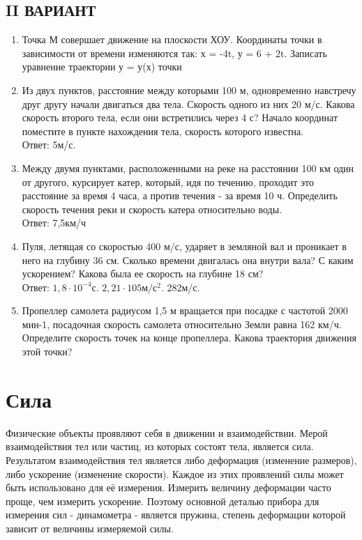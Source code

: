 \documentclass[a6paper, 11pt]{diss_4}
\renewcommand{\'}{\,'}
\begin{document}
\subsection{II ВАРИАНТ}
\begin{enumerate}
\item Точка М совершает движение на плоскости ХОУ. Координаты точки в зависимости от времени изменяются так: х = -4t, у = 6 + 2t. Записать уравнение траектории у = у(х) точки
\item Из двух пунктов, расстояние между которыми 100 м, одновременно навстречу друг другу начали двигаться два тела. Скорость одного из них 20 м/с. Какова скорость второго тела, если они встретились через 4 с? Начало координат поместите в пункте нахождения тела, скорость которого известна.
\\ Ответ: 5м/с.

\item Между двумя пунктами, расположенными на реке на расстоянии 100 км один от другого, курсирует катер, который, идя по течению, проходит это расстояние за время 4 часа, а против течения - за время 10 ч. Определить скорость течения реки и скорость катера относительно воды.
\\ Ответ: 7,5км/ч
\item Пуля, летящая со скоростью 400 м/с, ударяет в земляной вал и проникает в него на глубину 36 см. Сколько времени двигалась она внутри вала? С каким ускорением? Какова была ее скорость на глубине 18 см?
\\ Ответ: $1,8\cdot 10^{-4}с$.  $2,21\cdot 105м/с^2$.  282м/с.
\item Пропеллер самолета радиусом 1,5 м вращается при посадке с частотой 2000 мин-1, посадочная скорость самолета относительно Земли равна 162 км/ч. Определите скорость точек на конце пропеллера. Какова траектория движения этой точки?
\end{enumerate}

\section{Сила}

  Физические объекты проявляют себя в движении и взаимодействии. Мерой
взаимодействия тел или частиц, из которых состоят тела, является сила.
Результатом взаимодействия тел является либо деформация (изменение размеров),
либо ускорение (изменение скорости). Каждое из этих проявлений силы может быть
использовано для её измерения. Измерить величину деформации часто проще, чем
измерить ускорение. Поэтому основной деталью прибора для измерения сил -
динамометра - является пружина, степень деформации которой зависит от величины
измеряемой силы.
\end{document}
